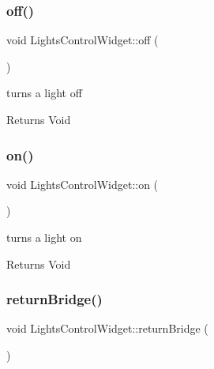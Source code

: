 \subsubsection{\texorpdfstring{off()}{off()}}
{\footnotesize\ttfamily void Lights\+Control\+Widget\+::off (\begin{DoxyParamCaption}{ }\end{DoxyParamCaption})\hspace{0.3cm}{\ttfamily [private]}}



turns a light off 

\begin{DoxyReturn}{Returns}
Void 
\end{DoxyReturn}
\mbox{\label{class_lights_control_widget_ad5e2249e08c869e8bd9b190937b93f3c}} 
\subsubsection{\texorpdfstring{on()}{on()}}
{\footnotesize\ttfamily void Lights\+Control\+Widget\+::on (\begin{DoxyParamCaption}{ }\end{DoxyParamCaption})\hspace{0.3cm}{\ttfamily [private]}}



turns a light on 

\begin{DoxyReturn}{Returns}
Void 
\end{DoxyReturn}
\mbox{\label{class_lights_control_widget_a4b17ac832e826eb5665a8f69fe73c5f4}} 
\subsubsection{\texorpdfstring{return\+Bridge()}{returnBridge()}}
{\footnotesize\ttfamily void Lights\+Control\+Widget\+::return\+Bridge (\begin{DoxyParamCaption}{ }\end{DoxyParamCaption})\hspace{0.3cm}{\ttfamily [private]}}



